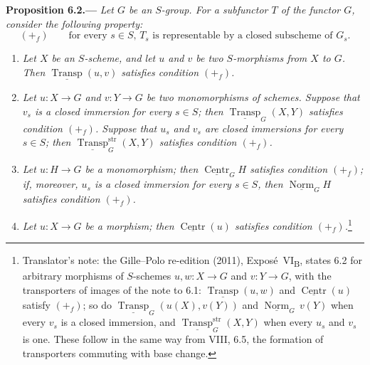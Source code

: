 
\medskip
{}\label{prop:sga3-VIB-6.2}%
\noindent\textbf{Proposition 6.2.---}%
\emph{Let \(G\) be an \(S\)-group. For a subfunctor \(T\) of the
functor \(G\), consider the following property:}
\[
  (+_{\!f})\qquad
  \text{for every \(s\in S\), \(T_s\) is representable by a
  closed subscheme of \(G_s\).}
\]
\begin{enumerate}
\item[\textup{(i)}]
  \emph{Let \(X\) be an \(S\)-scheme, and let \(u\) and \(v\) be two
  \(S\)-morphisms from \(X\) to \(G\). Then
  \(\underline{\operatorname{Transp}}(u,v)\) satisfies condition
  \((+_{\!f})\).}
\item[\textup{(ii)}]
  \emph{Let \(u:X\to G\) and \(v:Y\to G\) be two monomorphisms of
  schemes. Suppose that \(v_s\) is a closed immersion for every
  \(s\in S\); then \(\underline{\operatorname{Transp}}_G(X,Y)\)
  satisfies condition \((+_{\!f})\). Suppose that \(u_s\) and \(v_s\)
  are closed immersions for every \(s\in S\); then
  \(\underline{\operatorname{Transp}}^{\mathrm{str}}_G(X,Y)\)
  satisfies condition \((+_{\!f})\).}
\item[\textup{\SGAInlineRefTarget{prop:sga3-VIB-6.2:item:iii}(iii)}]
  \emph{Let \(u:H\to G\) be a monomorphism; then
  \(\underline{\operatorname{Centr}}_G H\) satisfies condition
  \((+_{\!f})\); if, moreover, \(u_s\) is a closed immersion for every
  \(s\in S\), then \(\underline{\operatorname{Norm}}_G H\) satisfies
  condition \((+_{\!f})\).}
\item[\textup{(iv)}]
  \emph{Let \(u:X\to G\) be a morphism; then
  \(\underline{\operatorname{Centr}}(u)\) satisfies condition
  \((+_{\!f})\).}\footnote{Translator's note: the Gille--Polo re-edition (2011), Expos\'e~VI\textsubscript{B},
  states 6.2 for arbitrary morphisms of \(S\)-schemes \(u,w\colon X\to G\) and \(v\colon Y\to G\), with the
  transporters of images of the note to 6.1:
  \(\underline{\operatorname{Transp}}(u,w)\) and \(\underline{\operatorname{Centr}}(u)\) satisfy \((+_{\!f})\);
  so do \(\underline{\operatorname{Transp}}_G(u(X),v(Y))\) and \(\underline{\operatorname{Norm}}_G\,v(Y)\) when
  every \(v_s\) is a closed immersion, and
  \(\underline{\operatorname{Transp}}^{\mathrm{str}}_G(X,Y)\) when every \(u_s\) and \(v_s\) is one. These follow
  in the same way from VIII, 6.5, the formation of transporters commuting with base change.}
\end{enumerate}

